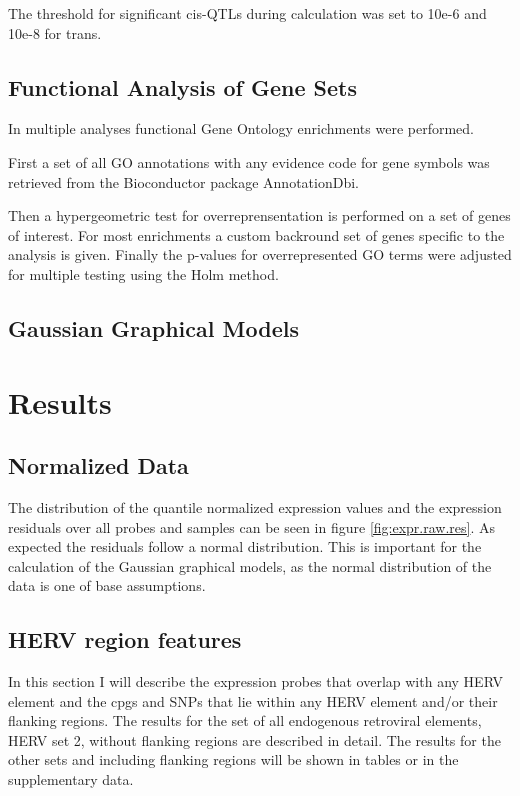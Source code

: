 \documentclass[a4paper,12pt]{article}
\begin{document}
The threshold for significant cis-QTLs during calculation was set to 10e-6 and 10e-8 for trans.

\subsection{Functional Analysis of Gene Sets}
In multiple analyses functional Gene Ontology enrichments were performed.

First a set of all GO annotations with any evidence code for gene symbols  was retrieved from the Bioconductor package AnnotationDbi\cite{AnnotationDbi}. 

Then a hypergeometric test\cite{GOstats} for overreprensentation is performed on a set of genes of interest. For most enrichments a custom backround set of genes specific to the analysis is given. Finally the p-values for overrepresented GO terms were adjusted for multiple testing using the Holm method\cite{10.2307/4615733}.

\subsection{Gaussian Graphical Models}




\newpage
\section{Results}
\subsection{Normalized Data}
The distribution of the quantile normalized expression values and the expression residuals over all probes and samples can be seen in figure \ref{fig:expr.raw.res}. As expected the residuals follow a normal distribution. This is important for the calculation of the Gaussian graphical models, as the normal distribution of the data is one of base assumptions\cite{}.

\subsection{HERV region features}
In this section I will describe the expression probes that overlap with any HERV element and the cpgs and SNPs that lie within any HERV element and/or their flanking regions. The results for the set of all endogenous retroviral elements, HERV set 2, without flanking regions are described in detail. The results for the other sets and including flanking regions will be shown in tables or in the supplementary data.
\end{document}
